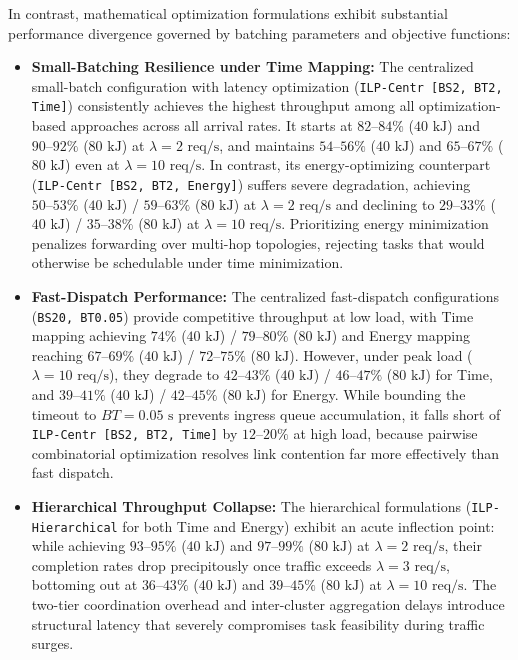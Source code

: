 In contrast, mathematical optimization formulations exhibit substantial performance divergence governed by batching parameters and objective functions:
\begin{itemize}
    \item \textbf{Small-Batching Resilience under Time Mapping:} The centralized small-batch configuration with latency optimization (\texttt{ILP-Centr [BS2, BT2, Time]}) consistently achieves the highest throughput among all optimization-based approaches across all arrival rates. It starts at $82\text{--}84\%$ ($40\text{ kJ}$) and $90\text{--}92\%$ ($80\text{ kJ}$) at $\lambda = 2\text{ req/s}$, and maintains $54\text{--}56\%$ ($40\text{ kJ}$) and $65\text{--}67\%$ ($80\text{ kJ}$) even at $\lambda = 10\text{ req/s}$. In contrast, its energy-optimizing counterpart (\texttt{ILP-Centr [BS2, BT2, Energy]}) suffers severe degradation, achieving $50\text{--}53\%$ ($40\text{ kJ}$) / $59\text{--}63\%$ ($80\text{ kJ}$) at $\lambda = 2\text{ req/s}$ and declining to $29\text{--}33\%$ ($40\text{ kJ}$) / $35\text{--}38\%$ ($80\text{ kJ}$) at $\lambda = 10\text{ req/s}$. Prioritizing energy minimization penalizes forwarding over multi-hop topologies, rejecting tasks that would otherwise be schedulable under time minimization.
    \item \textbf{Fast-Dispatch Performance:} The centralized fast-dispatch configurations (\texttt{BS20, BT0.05}) provide competitive throughput at low load, with Time mapping achieving $74\%$ ($40\text{ kJ}$) / $79\text{--}80\%$ ($80\text{ kJ}$) and Energy mapping reaching $67\text{--}69\%$ ($40\text{ kJ}$) / $72\text{--}75\%$ ($80\text{ kJ}$). However, under peak load ($\lambda = 10\text{ req/s}$), they degrade to $42\text{--}43\%$ ($40\text{ kJ}$) / $46\text{--}47\%$ ($80\text{ kJ}$) for Time, and $39\text{--}41\%$ ($40\text{ kJ}$) / $42\text{--}45\%$ ($80\text{ kJ}$) for Energy. While bounding the timeout to $BT = 0.05\text{ s}$ prevents ingress queue accumulation, it falls short of \texttt{ILP-Centr [BS2, BT2, Time]} by $12\text{--}20\%$ at high load, because pairwise combinatorial optimization resolves link contention far more effectively than fast dispatch.
    \item \textbf{Hierarchical Throughput Collapse:} The hierarchical formulations (\texttt{ILP-Hierarchical} for both Time and Energy) exhibit an acute inflection point: while achieving $93\text{--}95\%$ ($40\text{ kJ}$) and $97\text{--}99\%$ ($80\text{ kJ}$) at $\lambda = 2\text{ req/s}$, their completion rates drop precipitously once traffic exceeds $\lambda = 3\text{ req/s}$, bottoming out at $36\text{--}43\%$ ($40\text{ kJ}$) and $39\text{--}45\%$ ($80\text{ kJ}$) at $\lambda = 10\text{ req/s}$. The two-tier coordination overhead and inter-cluster aggregation delays introduce structural latency that severely compromises task feasibility during traffic surges.
\end{itemize}

